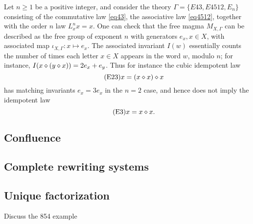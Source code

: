 \begin{example}  Let $n \geq 1$ be a positive integer, and consider the theory $\Gamma = \{E43, E4512, E_n\}$ consisting of the commutative law \eqref{eq43}, the associative law \eqref{eq4512}, together with the order $n$ law $L_x^n x = x$.  One can check that the free magma $M_{X,\Gamma}$ can be described as the free group of exponent $n$ with generators $e_x, x \in X$, with associated map $\iota_{X,\Gamma} \colon x \mapsto e_x$.  The associated invariant $I(w)$ essentially counts the number of times each letter $x \in X$ appears in the word $w$, modulo $n$; for instance, $I(x \diamond (y \diamond x)) = 2e_x + e_y$.  Thus for instance the cubic idempotent law
\begin{equation}\label{eq23}\tag{E23}
    x = (x \diamond x) \diamond x
\end{equation}
has matching invariants $e_x = 3e_x$ in the $n=2$ case, and hence does not imply the idempotent law
\begin{equation}\label{eq3}\tag{E3}
  x = x \diamond x.
\end{equation}
\end{example}


\subsection{Confluence}


\subsection{Complete rewriting systems}


\subsection{Unique factorization}

Discuss the 854 example
